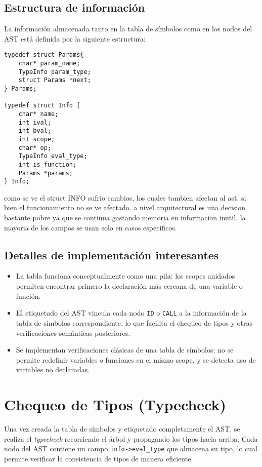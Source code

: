 \documentclass[12pt,a4paper]{article}
\begin{document}
\subsection{Estructura de información}
La información almacenada tanto en la tabla de símbolos como en los nodos del AST está definida por la siguiente estructura:

\begin{verbatim}
typedef struct Params{
    char* param_name;
    TypeInfo param_type;
    struct Params *next;
} Params;

typedef struct Info {
    char* name;
    int ival;
    int bval;
    int scope;
    char* op;
    TypeInfo eval_type;
    int is_function;
    Params *params;
} Info;
\end{verbatim}

como se ve el struct INFO sufrio cambios, los cuales tambien afectan al ast. si bien el funcionamiento no se ve afectado. a nivel arquitectural es una decision bastante pobre ya que se continua gastando memoria en informacion inutil. la mayoria de los campos se usan solo en casos especificos.
\subsection{Detalles de implementación interesantes}
\begin{itemize}
    \item La tabla funciona conceptualmente como una pila: los scopes anidados permiten encontrar primero la declaración más cercana de una variable o función.
    \item El etiquetado del AST vincula cada nodo \texttt{ID} o \texttt{CALL} a la información de la tabla de símbolos correspondiente, lo que facilita el chequeo de tipos y otras verificaciones semánticas posteriores.
    \item Se implementan verificaciones clásicas de una tabla de símbolos: no se permite redefinir variables o funciones en el mismo scope, y se detecta uso de variables no declaradas.
\end{itemize}

\section{Chequeo de Tipos (Typecheck)}

Una vez creada la tabla de símbolos y etiquetado completamente el AST, se realiza el \textit{typecheck} recorriendo el árbol y propagando los tipos hacia arriba. Cada nodo del AST contiene un campo \texttt{info->eval\_type} que almacena su tipo, lo cual permite verificar la consistencia de tipos de manera eficiente.
\end{document}
